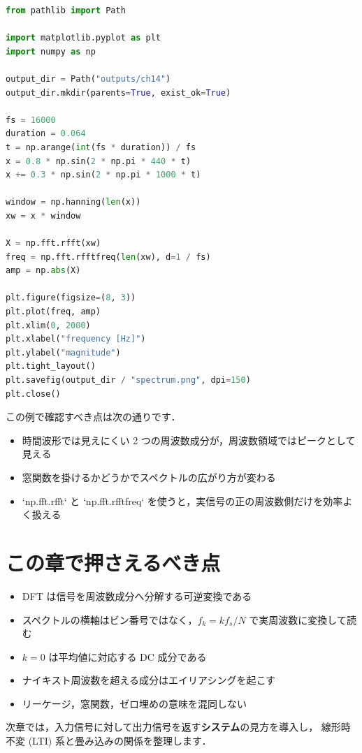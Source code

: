 \begin{lstlisting}[style=codecell,language=Python]
from pathlib import Path

import matplotlib.pyplot as plt
import numpy as np

output_dir = Path("outputs/ch14")
output_dir.mkdir(parents=True, exist_ok=True)

fs = 16000
duration = 0.064
t = np.arange(int(fs * duration)) / fs
x = 0.8 * np.sin(2 * np.pi * 440 * t)
x += 0.3 * np.sin(2 * np.pi * 1000 * t)

window = np.hanning(len(x))
xw = x * window

X = np.fft.rfft(xw)
freq = np.fft.rfftfreq(len(xw), d=1 / fs)
amp = np.abs(X)

plt.figure(figsize=(8, 3))
plt.plot(freq, amp)
plt.xlim(0, 2000)
plt.xlabel("frequency [Hz]")
plt.ylabel("magnitude")
plt.tight_layout()
plt.savefig(output_dir / "spectrum.png", dpi=150)
plt.close()
\end{lstlisting}

この例で確認すべき点は次の通りです．
\begin{itemize}
\item 時間波形では見えにくい 2 つの周波数成分が，周波数領域ではピークとして見える
\item 窓関数を掛けるかどうかでスペクトルの広がり方が変わる
\item `np.fft.rfft` と `np.fft.rfftfreq` を使うと，実信号の正の周波数側だけを効率よく扱える
\end{itemize}


\section{この章で押さえるべき点}

\begin{itemize}
\item DFT は信号を周波数成分へ分解する可逆変換である
\item スペクトルの横軸はビン番号ではなく，$f_k = kf_s/N$ で実周波数に変換して読む
\item $k=0$ は平均値に対応する DC 成分である
\item ナイキスト周波数を超える成分はエイリアシングを起こす
\item リーケージ，窓関数，ゼロ埋めの意味を混同しない
\end{itemize}

次章では，入力信号に対して出力信号を返す\textbf{システム}の見方を導入し，
線形時不変 (LTI) 系と畳み込みの関係を整理します．
